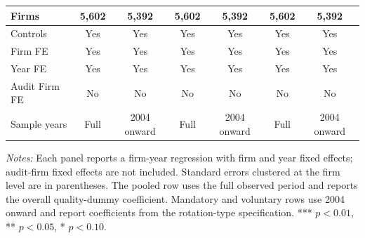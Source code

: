 \documentclass[10pt]{article}
\begin{document}
\begin{minipage}{19cm}
\begin{threeparttable}
\begin{tabular}{l cc cc cc}
Firms & 5,602 & 5,392 & 5,602 & 5,392 & 5,602 & 5,392 \\
\midrule
Controls & Yes & Yes & Yes & Yes & Yes & Yes \\
Firm FE & Yes & Yes & Yes & Yes & Yes & Yes \\
Year FE & Yes & Yes & Yes & Yes & Yes & Yes \\
Audit Firm FE & No & No & No & No & No & No \\
Sample years & Full & 2004 onward & Full & 2004 onward & Full & 2004 onward \\
\bottomrule
\end{tabular}
\begin{tablenotes}\fontsize{9}{11}\selectfont
\item \fontsize{9}{11}\selectfont \textit{Notes:} Each panel reports a firm-year regression with firm and year fixed effects; audit-firm fixed effects are not included. Standard errors clustered at the firm level are in parentheses. The pooled row uses the full observed period and reports the overall quality-dummy coefficient. Mandatory and voluntary rows use 2004 onward and report coefficients from the rotation-type specification. *** \(p<0.01\), ** \(p<0.05\), * \(p<0.10\).
\end{tablenotes}
\end{threeparttable}

\end{minipage}
\end{document}
